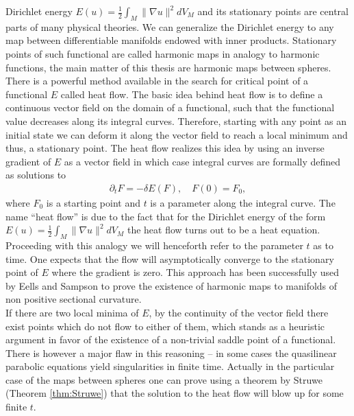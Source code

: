 Dirichlet energy $E(u)=\frac{1}{2}\int_M \lVert \nabla u\rVert^2 dV_M$
and its stationary points are central parts of many physical
theories. We can generalize the Dirichlet energy to any map between
differentiable manifolds endowed with inner products. Stationary
points of such functional are called harmonic maps in analogy to
harmonic functions, the main matter of this thesis are harmonic maps
between spheres.
\\

There is a powerful method available in the search for critical point
of a functional $E$ called heat flow. The basic idea behind heat flow
is to define a continuous vector field on the domain of a functional,
such that the functional value decreases along its integral
curves. Therefore, starting with any point as an initial state we can
deform it along the vector field to reach a local minimum and thus, a
stationary point. The heat flow realizes this idea by using an inverse
gradient of $E$ as a vector field in which case integral curves are
formally defined as solutions to
\begin{align*}
  \partial_t F=-\delta E(F),\quad F(0)=F_0,
\end{align*}
where $F_0$ is a starting point and $t$ is a parameter along the
integral curve. The name ``heat flow'' is due to the fact that for the
Dirichlet energy of the form $E(u)=\frac{1}{2}\int_M \lVert \nabla
u\rVert^2 dV_M$ the heat flow turns out to be a heat
equation. Proceeding with this analogy we will henceforth refer to the
parameter $t$ as to time. One expects that the flow will
asymptotically converge to the stationary point of $E$ where the
gradient is zero. This approach has been successfully used by Eells
and Sampson \cite{Eells1964} to prove the existence of harmonic maps
to manifolds of non positive sectional curvature.
\\

If there are two local minima of $E$, by the continuity of the vector
field there exist points which do not flow to either of them, which
stands as a heuristic argument in favor of the existence of a
non-trivial saddle point of a functional. There is however a major
flaw in this reasoning -- in some cases the quasilinear parabolic
equations yield singularities in finite time. Actually in the
particular case of the maps between spheres one can prove using a
theorem by Struwe (Theorem \ref{thm:Struwe}) that the solution
to the heat flow will blow up for some finite $t$.\\

